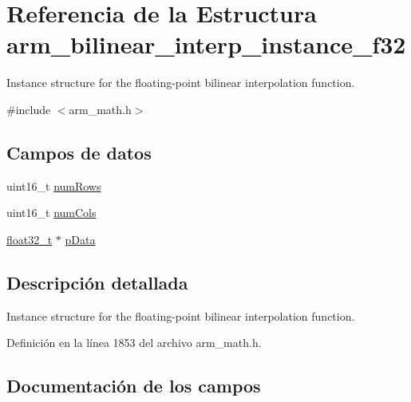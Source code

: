 \hypertarget{structarm__bilinear__interp__instance__f32}{}\section{Referencia de la Estructura arm\+\_\+bilinear\+\_\+interp\+\_\+instance\+\_\+f32}
\label{structarm__bilinear__interp__instance__f32}


Instance structure for the floating-\/point bilinear interpolation function.  




{\ttfamily \#include $<$arm\+\_\+math.\+h$>$}

\subsection*{Campos de datos}
\begin{DoxyCompactItemize}
\item 
uint16\+\_\+t \hyperlink{structarm__bilinear__interp__instance__f32_a1bcf80ccdc2acc29198f1592ae300390}{num\+Rows}
\item 
uint16\+\_\+t \hyperlink{structarm__bilinear__interp__instance__f32_a4bb5ec0d13eb4c9cf887aa8366a44117}{num\+Cols}
\item 
\hyperlink{arm__math_8h_a4611b605e45ab401f02cab15c5e38715}{float32\+\_\+t} $\ast$ \hyperlink{structarm__bilinear__interp__instance__f32_af5c3a2f15c98850cdcfbe6f87e5ac5df}{p\+Data}
\end{DoxyCompactItemize}


\subsection{Descripción detallada}
Instance structure for the floating-\/point bilinear interpolation function. 

Definición en la línea 1853 del archivo arm\+\_\+math.\+h.



\subsection{Documentación de los campos}
